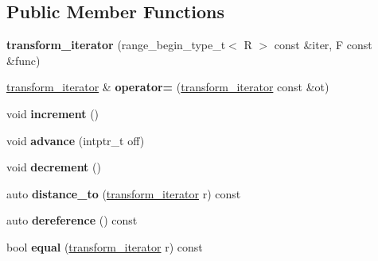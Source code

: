 \subsection*{Public Member Functions}
\begin{DoxyCompactItemize}
\item 
\mbox{\label{struct_r_a_h___n_a_m_e_s_p_a_c_e_1_1view_1_1transform__iterator_ac734c82ed270bf0323dd7f7361de9b2b}} 
{\bfseries transform\+\_\+iterator} (range\+\_\+begin\+\_\+type\+\_\+t$<$ R $>$ const \&iter, F const \&func)
\item 
\mbox{\label{struct_r_a_h___n_a_m_e_s_p_a_c_e_1_1view_1_1transform__iterator_ae4aafe9c80f18c04166df44cfc7c9951}} 
\mbox{\hyperlink{struct_r_a_h___n_a_m_e_s_p_a_c_e_1_1view_1_1transform__iterator}{transform\+\_\+iterator}} \& {\bfseries operator=} (\mbox{\hyperlink{struct_r_a_h___n_a_m_e_s_p_a_c_e_1_1view_1_1transform__iterator}{transform\+\_\+iterator}} const \&ot)
\item 
\mbox{\label{struct_r_a_h___n_a_m_e_s_p_a_c_e_1_1view_1_1transform__iterator_a314c8d51a27d0d39f0a810e6fb7c1fc1}} 
void {\bfseries increment} ()
\item 
\mbox{\label{struct_r_a_h___n_a_m_e_s_p_a_c_e_1_1view_1_1transform__iterator_ae868c91f78e921f3ff63cf7c23ebc77e}} 
void {\bfseries advance} (intptr\+\_\+t off)
\item 
\mbox{\label{struct_r_a_h___n_a_m_e_s_p_a_c_e_1_1view_1_1transform__iterator_a99b8d1749560539e4b1c2d7cda4074c0}} 
void {\bfseries decrement} ()
\item 
\mbox{\label{struct_r_a_h___n_a_m_e_s_p_a_c_e_1_1view_1_1transform__iterator_abb46d19168d30284cd232094a219f432}} 
auto {\bfseries distance\+\_\+to} (\mbox{\hyperlink{struct_r_a_h___n_a_m_e_s_p_a_c_e_1_1view_1_1transform__iterator}{transform\+\_\+iterator}} r) const
\item 
\mbox{\label{struct_r_a_h___n_a_m_e_s_p_a_c_e_1_1view_1_1transform__iterator_a74509747cb7b599f23f0d169450b344f}} 
auto {\bfseries dereference} () const
\item 
\mbox{\label{struct_r_a_h___n_a_m_e_s_p_a_c_e_1_1view_1_1transform__iterator_a7f9d61a4a68fa70f51253066c7fe9321}} 
bool {\bfseries equal} (\mbox{\hyperlink{struct_r_a_h___n_a_m_e_s_p_a_c_e_1_1view_1_1transform__iterator}{transform\+\_\+iterator}} r) const
\end{DoxyCompactItemize}
